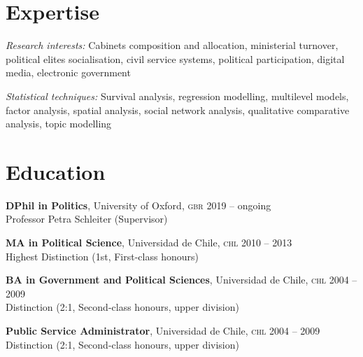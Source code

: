 \documentclass[letterpaper,margin]{res}
\begin{document}
\begin{resume} 


\section{\footnotesize Expertise}

{\small {\itshape Research interests:} Cabinets composition and allocation, ministerial turnover, political elites socialisation, civil service systems, political participation, digital media, electronic government}

{\small {\itshape Statistical techniques:} Survival analysis, regression modelling, multilevel models, factor analysis, spatial analysis, social network analysis, qualitative comparative analysis,  topic modelling}

  
\section{\footnotesize Education}

{\small {\bfseries DPhil in Politics}, University of Oxford, {\scshape gbr}} \hfill {\small 2019 -- ongoing}\\
{\small Professor Petra Schleiter (Supervisor)}

{\small {\bfseries MA in Political Science}, Universidad de Chile, {\scshape chl}} \hfill {\small 2010 -- 2013}\\
{\small Highest Distinction (1st, First-class honours)}

{\small {\bfseries BA in Government and Political Sciences}, Universidad de Chile, {\scshape chl}}  \hfill {\small 2004 -- 2009}\\
{\small Distinction (2:1, Second-class honours, upper division)}

{\small {\bfseries Public Service Administrator}, Universidad de Chile, {\scshape chl}}  \hfill {\small 2004 -- 2009}\\
{\small Distinction (2:1, Second-class honours, upper division)}


\end{resume}
\end{document}
